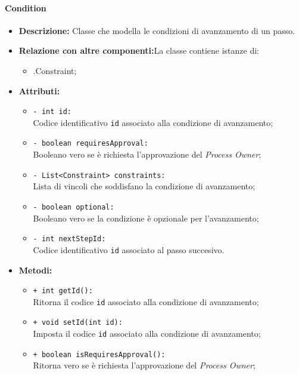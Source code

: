 \paragraph{Condition}
\label{botcondition}
\begin{flushleft}
\begin{itemize}
\item \textbf{Descrizione:} Classe che modella le condizioni di avanzamento di un passo.
\item \textbf{Relazione con altre componenti:}La classe contiene istanze di:
		\begin{itemize}
			\item \smodel{}.Constraint;
		\end{itemize}
\item \textbf{Attributi:}
\begin{sloppypar}
\begin{itemize}
\item \texttt{- int id:}\\ Codice identificativo \texttt{id} associato alla condizione di avanzamento;
\item \texttt{- boolean requiresApproval:}\\ Booleano vero se è richiesta l'approvazione del \textit{Process Owner};
\item \texttt{- List<Constraint> constraints:}\\ Lista di vincoli che soddisfano la condizione di avanzamento;
\item \texttt{- boolean optional:}\\ Booleano vero se la condizione è opzionale per l'avanzamento;
\item \texttt{- int nextStepId:}\\ Codice identificativo \texttt{id} associato al passo succesivo.
\end{itemize}
\end{sloppypar}
\item \textbf{Metodi:}
\begin{sloppypar}
\begin{itemize}
\item \texttt{+ int getId():}\\ Ritorna il codice \texttt{id} associato alla condizione di avanzamento;
\item \texttt{+ void setId(int id):}\\ Imposta il codice \texttt{id} associato alla condizione di avanzamento;
\item \texttt{+ boolean isRequiresApproval():}\\ Ritorna vero se è richiesta l'approvazione del \textit{Process Owner};

\end{itemize}
\end{sloppypar}
\end{itemize}
\end{flushleft}
